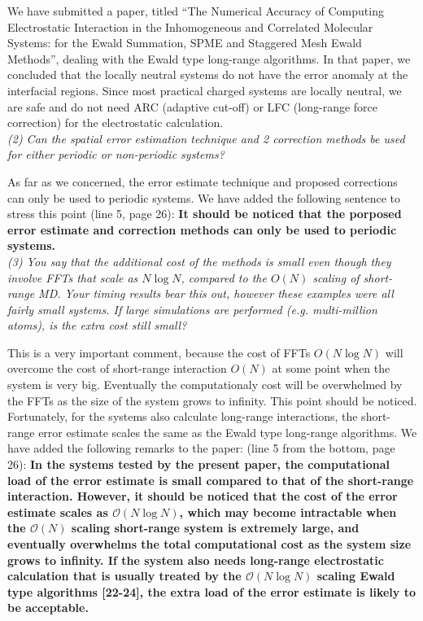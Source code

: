 \documentclass[a4paper]{article}
\begin{document}
We have submitted a paper, titled ``The Numerical Accuracy of Computing
Electrostatic Interaction in the Inhomogeneous and Correlated
Molecular Systems: for the Ewald Summation, SPME and Staggered Mesh
Ewald Methods'', dealing with the Ewald type long-range
algorithms. In that paper, we concluded that the locally neutral systems
do not have the error anomaly at the interfacial regions. Since
most practical charged systems are locally neutral, we are safe and
do not need ARC (adaptive cut-off) or LFC (long-range force correction)
for the electrostatic calculation.
\\

\textit{
(2) Can the spatial error estimation technique and 2 correction
methods be used for either periodic or non-periodic systems?
}

As far as we concerned, the error estimate technique and proposed
corrections can only be used to periodic systems.
We have added the following sentence to stress this point
(line 5, page 26):
\textbf{It should be noticed that the porposed error estimate and correction
methods can only be used to periodic systems.}
\\


\textit{
  (3) You say that the additional cost of the methods is small even
though they involve FFTs that scale as $N\log N$, compared to the $O(N)$
scaling of short-range MD. Your timing results bear this out, however
these examples were all fairly small systems. If large simulations are
performed (e.g. multi-million atoms), is the extra cost still small?}

This is a very important comment, because
the cost of FFTs $O(N\log N)$ will overcome the cost of short-range
interaction $O(N)$ at some point when the system is very
big. Eventually the computationaly cost will be overwhelmed by the
FFTs as the size of the system grows to infinity.
This point should be noticed.  Fortunately, for the systems
also calculate long-range interactions, the short-range error estimate
scales the same as the Ewald type long-range algorithms.
We have added the following remarks to the paper:
(line 5 from the bottom, page 26):
\textbf{In the systems tested by the present paper, the computational
  load of the error estimate is small compared to that of the
  short-range interaction.
  However, it should be noticed that
  the cost of the error estimate scales as $\mathcal O(N\log N)$,
  which may become intractable when the $\mathcal O(N)$ scaling
  short-range system is extremely large, and eventually
  overwhelms the total computational cost as the
  system size grows to infinity.
  If the system also needs long-range electrostatic calculation
  that is usually treated by the $\mathcal O(N\log N)$ scaling
  Ewald type algorithms [22-24],
  the extra load of the error estimate is likely to be acceptable.
}
\end{document}
